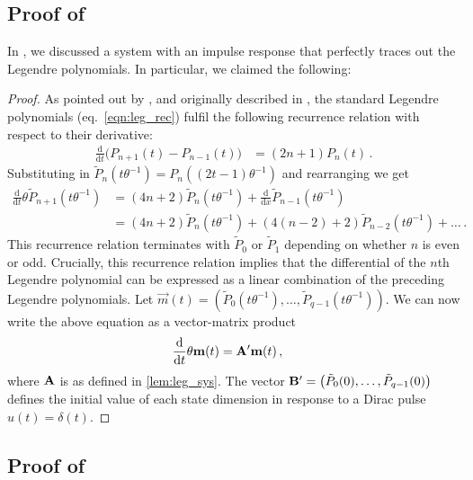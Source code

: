 \subsection{Proof of }
\label{app:leg_sys_proof}

In , we discussed a \LTI system with an impulse response that perfectly traces out the Legendre polynomials.
In particular, we claimed the following:

\LemLegSys*

\begin{proof}
As pointed out by \citet[Appendix B.1.1]{gu2020hippo}, and originally described in \citet[Chapter 12.2, p.~751]{arfken2005mathematical}, the standard Legendre polynomials (eq.~\ref{eqn:leg_rec}) fulfil the following recurrence relation with respect to their derivative:
\begin{align*}
	\frac{\mathrm{d}}{\mathrm{d}t} \big( P_{n + 1}(t) - P_{n - 1}(t) \big) &= (2n + 1) P_n(t) \,.
\end{align*}
Substituting in $\tilde P_n(t \theta^{-1}) = P_n((2t - 1) \theta^{-1})$ and rearranging we get
\begin{align*}
	\frac{\mathrm{d}}{\mathrm{d}t} \theta \tilde P_{n + 1}(t \theta^{-1})
		&= (4n + 2) \tilde P_n(t \theta^{-1}) + \frac{\mathrm{d}}{\mathrm{d}x} \tilde P_{n - 1}(t \theta^{-1}) \\
		&= (4n + 2) \tilde P_n(t \theta^{-1}) + (4(n - 2) + 2) \tilde P_{n - 2}(t \theta^{-1}) + \ldots \,.
\end{align*}
This recurrence relation terminates with $\tilde P_0$ or $\tilde P_1$ depending on whether $n$ is even or odd.
Crucially, this recurrence relation implies that the differential of the $n$th Legendre polynomial can be expressed as a linear combination of the preceding Legendre polynomials.
Let $\vec m(t) = (\tilde P_0(t \theta^{-1}), \ldots, \tilde P_{q - 1}(t \theta^{-1}))$. We can now write the above equation as a vector-matrix product
\begin{align*}
	\frac{\mathrm{d}}{\mathrm{d}t} \theta \mathbf{m}(t) &= {\mathbf{A}}' \mathbf{m}(t) \,,
\end{align*}
where ${\mathbf{A}}$ is as defined in \cref{lem:leg_sys}.
The vector ${\mathbf{B}}' = \big( \tilde P_0(0), \ldots, \tilde P_{q - 1}(0)\big)$ defines the initial value of each state dimension in response to a Dirac pulse $u(t) = \delta(t)$. \qedhere
\end{proof}

\subsection{Proof of }

